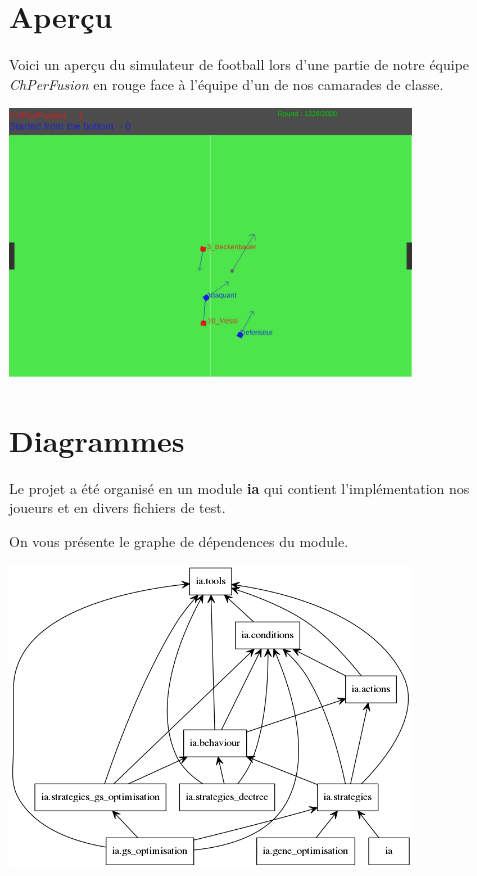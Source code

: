 \documentclass[12pt,a4paper]{article}
\begin{document}
\section*{Aper\c{c}u}
Voici un aper\c{c}u du simulateur de football lors d'une partie de notre 
\'equipe {\itshape ChPerFusion} en rouge face \`a l'\'equipe d'un de nos 
camarades de classe.

\begin{center}
\includegraphics[width=0.8\textwidth]{apercu.png}\par%
\end{center}

\section*{Diagrammes}
Le projet a \'et\'e organis\'e en un module {\bfseries ia} qui contient 
l'impl\'ementation nos joueurs et en divers fichiers de test.

On vous pr\'esente le graphe de d\'ependences du module.

\begin{center}
  \includegraphics[width=0.8\textwidth]{packages_IA.png}\par%
\end{center}
\end{document}
